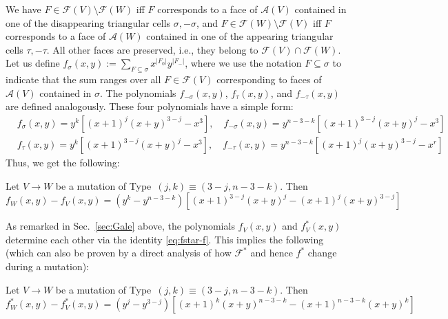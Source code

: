 \documentclass[a4paper,USenglish,cleveref, autoref, thm-restate,nolineno]{socg-lipics-v2021}
\newcommand{\arr}{\mathcal{A}}
\begin{document}
We have $F\in \mathcal{F}(V)\setminus \mathcal{F}(W)$ iff $F$ corresponds to a face of $\arr(V)$ contained in one of the disappearing triangular cells $\sigma,-\sigma$, and $F\in \mathcal{F}(W)\setminus \mathcal{F}(V)$ iff $F$ corresponds to a face of $\arr(W)$ contained in one of the appearing triangular cells $\tau,-\tau$. All other faces are preserved, i.e., they belong to $\mathcal{F}(V) \cap \mathcal{F}(W)$. 
Let us define $f_\sigma(x,y):=\sum_{F\subseteq \sigma}  x^{|F_0|}y^{|F_-|}$, 
where we use the notation $F\subseteq \sigma$ to indicate that the sum ranges over all $F \in \mathcal{F}(V)$ corresponding to faces of $\arr(V)$ contained in $\sigma$. The polynomials $f_{-\sigma}(x,y)$,  $f_\tau(x,y)$, and $f_{-\tau}(x,y)$ are defined analogously. 
These four polynomials have a simple form:
\begin{eqnarray*}
& f_\sigma (x,y)=y^k\left[(x+1)^{j}(x+y)^{3-j}-x^3\right],\quad f_{-\sigma}(x,y)=y^{n-3-k}\left[(x+1)^{3-j}(x+y)^{j}-x^3\right] & \\
& f_\tau(x,y)=y^k\left[(x+1)^{3-j}(x+y)^{j}-x^3\right],\quad f_{-\tau}(x,y)=y^{n-3-k}\left[(x+1)^{j}(x+y)^{3-j}-x^r\right]
\end{eqnarray*}
Thus, we get the following:
\begin{lemma}
\label{lem:f-mutation}
Let $V\to W$ be a mutation of Type~$(j,k)\equiv(3-j,n-3-k)$. Then
\begin{equation}
\label{eq:f-g-mutation}
f_W(x,y)-f_V(x,y) = \left(y^k - y^{n-3-k}\right)\left[(x+1)^{3-j}(x+y)^{j} - (x+1)^{j}(x+y)^{3-j}\right]
\end{equation}
\end{lemma}
As remarked in Sec.~\ref{sec:Gale} above, the polynomials $f_V(x,y)$ and $f^*_V(x,y)$ determine each other via the identity \eqref{eq:fstar-f}. This implies the following (which can also be proven by a direct analysis of how $\mathcal{F}^*$ and hence $f^*$ change during a mutation):
\begin{lemma}
\label{lem:fstar-mutation}
Let $V\to W$ be a mutation of Type~$(j,k)\equiv(3-j,n-3-k)$. Then
\begin{equation}
\label{eq:fstar-g-mutation}
f^*_W(x,y)-f^*_V(x,y) = \left(y^j - y^{3-j}\right)\left[(x+1)^{k}(x+y)^{n-3-k} - (x+1)^{n-3-k}(x+y)^{k}\right]
\end{equation}
\end{lemma}
\end{document}
